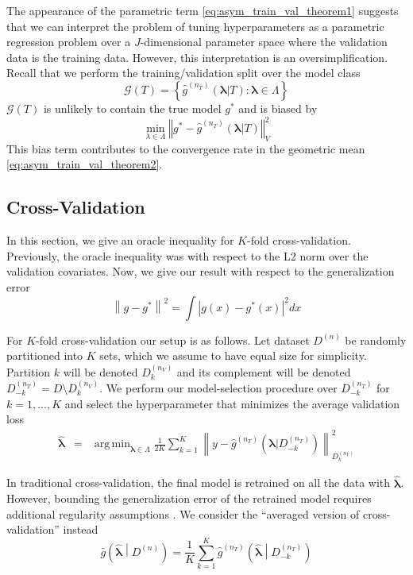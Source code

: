 \documentclass[12pt]{article}
\DeclareMathOperator*{\argmin}{arg\,min}
\begin{document}
The appearance of the parametric term \eqref{eq:asym_train_val_theorem1} suggests that we can interpret the problem of tuning hyperparameters as a parametric regression problem over a $J$-dimensional parameter space where the validation data is the training data. However, this interpretation is an oversimplification. Recall that we perform the training/validation split over the model class
\begin{equation}
\mathcal{G}(T) = \left \{ \hat{g}^{(n_T)}( {\boldsymbol{\lambda}}| T) : \boldsymbol{\lambda} \in \Lambda \right \}
\end{equation}
$\mathcal{G}(T)$ is unlikely to contain the true model $g^*$ and is biased by
\begin{equation}
\min_{\lambda \in \Lambda} \left\Vert g^* - \hat{g}^{(n_T)}( \boldsymbol{\lambda}|T) \right \Vert^2_{V}
\end{equation}
This bias term contributes to the convergence rate in the geometric mean \eqref{eq:asym_train_val_theorem2}.

\subsection{Cross-Validation}\label{sec:cv}

In this section, we give an oracle inequality for $K$-fold cross-validation. Previously, the oracle inequality was with respect to the L2 norm over the validation covariates. Now, we give our result with respect to the generalization error
\begin{equation}
\left \| g - g^* \right \|^2 = \int \left |g(x) - g^*(x) \right |^2 dx
\end{equation}

For $K$-fold cross-validation our setup is as follows. Let dataset $D^{(n)}$ be randomly partitioned into $K$ sets, which we assume to have equal size for simplicity. Partition $k$ will be denoted $D_k^{(n_V)}$ and its complement will be denoted $D_{-k}^{(n_T)} = D \setminus D_k^{(n_V)}$. We perform our model-selection procedure over $D_{-k}^{(n_T)}$ for $k=1,...,K$ and select the hyperparameter that minimizes the average validation loss
\begin{eqnarray}
\label{kfold_opt}
\hat{\boldsymbol \lambda} &=& \argmin_{\boldsymbol{\lambda} \in\Lambda} \frac{1}{2K} \sum_{k=1}^K  \left \| y-\hat{g}^{(n_T)}(\boldsymbol \lambda | D_{-k}^{(n_T)}) \right \|_{D_k^{(n_V)}}^{2}
\end{eqnarray}

In traditional cross-validation, the final model is retrained on all the data with $\hat{\boldsymbol{\lambda}}$. However, bounding the generalization error of the retrained model requires additional regularity assumptions \citep{lecue2012oracle}. We consider the ``averaged version of cross-validation'' instead
\begin{equation}
\label{thrm:avg_cv}
\bar{g}\left ( \hat{\boldsymbol \lambda} \middle | {D^{(n)}} \right ) = 
\frac{1}{K} \sum_{k=1}^K 
\hat{g}^{(n_T)} \left (\hat{\boldsymbol \lambda} \middle | D^{(n_T)}_{-k} \right )
\end{equation}
\end{document}
